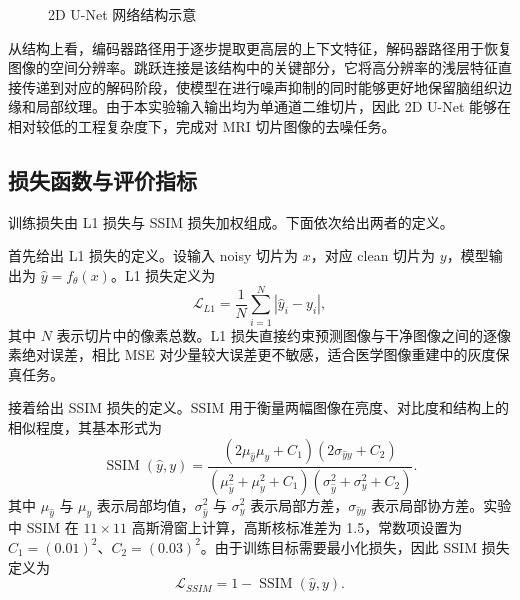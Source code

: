 \documentclass[UTF8,a4paper,12pt]{ctexart}
\begin{document}
\begin{figure}[H]
{
}
\caption{2D U-Net 网络结构示意}
\label{fig:unet_arch}
\end{figure}

从结构上看，编码器路径用于逐步提取更高层的上下文特征，解码器路径用于恢复图像的空间分辨率。跳跃连接是该结构中的关键部分，它将高分辨率的浅层特征直接传递到对应的解码阶段，使模型在进行噪声抑制的同时能够更好地保留脑组织边缘和局部纹理。由于本实验输入输出均为单通道二维切片，因此 2D U-Net 能够在相对较低的工程复杂度下，完成对 MRI 切片图像的去噪任务。

\subsection{损失函数与评价指标}

训练损失由 L1 损失与 SSIM 损失加权组成。下面依次给出两者的定义。

首先给出 L1 损失的定义。设输入 noisy 切片为 $x$，对应 clean 切片为 $y$，模型输出为 $\hat{y}=f_{\theta}(x)$。L1 损失定义为
\begin{equation}
\mathcal{L}_{L1}=\frac{1}{N}\sum_{i=1}^{N}|\hat{y}_i-y_i| ,
\end{equation}
其中 $N$ 表示切片中的像素总数。L1 损失直接约束预测图像与干净图像之间的逐像素绝对误差，相比 MSE 对少量较大误差更不敏感，适合医学图像重建中的灰度保真任务。

接着给出 SSIM 损失的定义。SSIM 用于衡量两幅图像在亮度、对比度和结构上的相似程度，其基本形式为
\begin{equation}
\operatorname{SSIM}(\hat{y},y)=
\frac{(2\mu_{\hat{y}}\mu_y+C_1)(2\sigma_{\hat{y}y}+C_2)}
{(\mu_{\hat{y}}^2+\mu_y^2+C_1)(\sigma_{\hat{y}}^2+\sigma_y^2+C_2)} .
\end{equation}
其中 $\mu_{\hat{y}}$ 与 $\mu_y$ 表示局部均值，$\sigma_{\hat{y}}^2$ 与 $\sigma_y^2$ 表示局部方差，$\sigma_{\hat{y}y}$ 表示局部协方差。实验中 SSIM 在 $11\times11$ 高斯滑窗上计算，高斯核标准差为 1.5，常数项设置为 $C_1=(0.01)^2$、$C_2=(0.03)^2$。由于训练目标需要最小化损失，因此 SSIM 损失定义为
\begin{equation}
\mathcal{L}_{SSIM}=1-\operatorname{SSIM}(\hat{y},y).
\end{equation}
\end{document}
